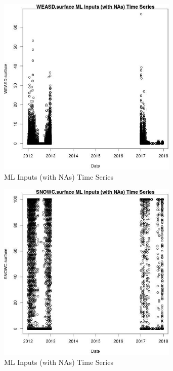 \begin{figure} 
\centering  
\includegraphics[width=0.77\textwidth]{Code_Outputs/Report_ML_input_PM25_Step4_part_e_de_duplicated_aves_compiled_2019-05-14wNAs_WEASDsurfacevDate.jpg} 
\caption{\label{fig:Report_ML_input_PM25_Step4_part_e_de_duplicated_aves_compiled_2019-05-14wNAsWEASDsurfacevDate}ML Inputs (with NAs) Time Series} 
\end{figure} 
 

\begin{figure} 
\centering  
\includegraphics[width=0.77\textwidth]{Code_Outputs/Report_ML_input_PM25_Step4_part_e_de_duplicated_aves_compiled_2019-05-14wNAs_SNOWCsurfacevDate.jpg} 
\caption{\label{fig:Report_ML_input_PM25_Step4_part_e_de_duplicated_aves_compiled_2019-05-14wNAsSNOWCsurfacevDate}ML Inputs (with NAs) Time Series} 
\end{figure} 
 

